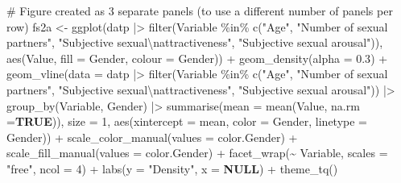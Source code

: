 \documentclass[
  bookmarksnumbered]{article}
\newenvironment{Shaded}{\begin{snugshade}}{\end{snugshade}}
\newcommand{\AttributeTok}[1]{\textcolor[rgb]{0.80,0.80,0.80}{#1}}
\newcommand{\CommentTok}[1]{\textcolor[rgb]{0.50,0.62,0.50}{#1}}
\newcommand{\ConstantTok}[1]{\textcolor[rgb]{0.86,0.64,0.64}{\textbf{#1}}}
\newcommand{\DecValTok}[1]{\textcolor[rgb]{0.86,0.86,0.80}{#1}}
\newcommand{\FloatTok}[1]{\textcolor[rgb]{0.75,0.75,0.82}{#1}}
\newcommand{\FunctionTok}[1]{\textcolor[rgb]{0.94,0.94,0.56}{#1}}
\newcommand{\NormalTok}[1]{\textcolor[rgb]{0.80,0.80,0.80}{#1}}
\newcommand{\OtherTok}[1]{\textcolor[rgb]{0.94,0.94,0.56}{#1}}
\newcommand{\SpecialCharTok}[1]{\textcolor[rgb]{0.86,0.64,0.64}{#1}}
\newcommand{\StringTok}[1]{\textcolor[rgb]{0.80,0.58,0.58}{#1}}
\begin{document}
\begin{Shaded}
\begin{Highlighting}[]
\CommentTok{\# Figure created as 3 separate panels (to use a different number of panels per row)}
\NormalTok{fs2a }\OtherTok{\textless{}{-}} \FunctionTok{ggplot}\NormalTok{(datp }\SpecialCharTok{|\textgreater{}}
                 \FunctionTok{filter}\NormalTok{(Variable }\SpecialCharTok{\%in\%} \FunctionTok{c}\NormalTok{(}\StringTok{"Age"}\NormalTok{,}
                                      \StringTok{"Number of sexual partners"}\NormalTok{,}
                                      \StringTok{"Subjective sexual}\SpecialCharTok{\textbackslash{}n}\StringTok{attractiveness"}\NormalTok{,}
                                      \StringTok{"Subjective sexual arousal"}\NormalTok{)),}
             \FunctionTok{aes}\NormalTok{(Value,}
                 \AttributeTok{fill =}\NormalTok{ Gender,}
                 \AttributeTok{colour =}\NormalTok{ Gender)) }\SpecialCharTok{+}
        \FunctionTok{geom\_density}\NormalTok{(}\AttributeTok{alpha =} \FloatTok{0.3}\NormalTok{) }\SpecialCharTok{+}
        \FunctionTok{geom\_vline}\NormalTok{(}\AttributeTok{data =}\NormalTok{ datp }\SpecialCharTok{|\textgreater{}}
                     \FunctionTok{filter}\NormalTok{(Variable }\SpecialCharTok{\%in\%} \FunctionTok{c}\NormalTok{(}\StringTok{"Age"}\NormalTok{,}
                                            \StringTok{"Number of sexual partners"}\NormalTok{,}
                                            \StringTok{"Subjective sexual}\SpecialCharTok{\textbackslash{}n}\StringTok{attractiveness"}\NormalTok{,}
                                            \StringTok{"Subjective sexual arousal"}\NormalTok{)) }\SpecialCharTok{|\textgreater{}} 
                     \FunctionTok{group\_by}\NormalTok{(Variable, Gender) }\SpecialCharTok{|\textgreater{}}
                     \FunctionTok{summarise}\NormalTok{(}\AttributeTok{mean =} \FunctionTok{mean}\NormalTok{(Value, }\AttributeTok{na.rm =}\ConstantTok{TRUE}\NormalTok{)),}
                   \AttributeTok{size =} \DecValTok{1}\NormalTok{,}
                   \FunctionTok{aes}\NormalTok{(}\AttributeTok{xintercept =}\NormalTok{ mean, }\AttributeTok{color =}\NormalTok{ Gender, }\AttributeTok{linetype =}\NormalTok{ Gender)) }\SpecialCharTok{+}
        \FunctionTok{scale\_color\_manual}\NormalTok{(}\AttributeTok{values =}\NormalTok{ color.Gender) }\SpecialCharTok{+}
        \FunctionTok{scale\_fill\_manual}\NormalTok{(}\AttributeTok{values =}\NormalTok{ color.Gender) }\SpecialCharTok{+}
        \FunctionTok{facet\_wrap}\NormalTok{(}\SpecialCharTok{\textasciitilde{}}\NormalTok{ Variable,}
                   \AttributeTok{scales =} \StringTok{"free"}\NormalTok{,}
                   \AttributeTok{ncol =} \DecValTok{4}\NormalTok{) }\SpecialCharTok{+}
        \FunctionTok{labs}\NormalTok{(}\AttributeTok{y =} \StringTok{"Density"}\NormalTok{,}
             \AttributeTok{x =} \ConstantTok{NULL}\NormalTok{) }\SpecialCharTok{+}
        \FunctionTok{theme\_tq}\NormalTok{()}


\end{Highlighting}
\end{Shaded}
\end{document}
